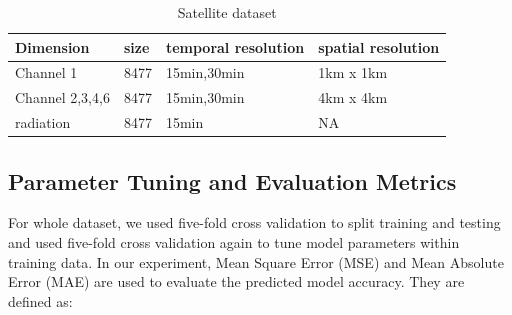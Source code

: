 \documentclass[conference]{IEEEtran}
\begin{document}
\begin{table}[htb]
\caption{Satellite dataset}
\centering
\label{tab:dataset}
    \begin{tabular}{   l  |  l  |  l  | l }
    \hline
   Dimension	&size	&temporal resolution	&spatial resolution  \\ \hline
   Channel 1	&8477   &15min,30min			&1km x 1km    \\ \hline
   Channel 2,3,4,6	&8477   &15min,30min		&4km x 4km    \\ \hline
   radiation	&8477   &15min			&NA    \\ \hline 
   \hline
    \end{tabular}
\end{table}


\subsection{Parameter Tuning and Evaluation Metrics}
\label{subsec:esti_e}

For whole dataset, we used five-fold cross validation to split training and testing 
and used five-fold cross validation again to tune model parameters within
training data. In our experiment, Mean Square Error (MSE) and Mean Absolute
Error (MAE) are used to evaluate the predicted model accuracy.
They are defined as:
 
\end{document}
